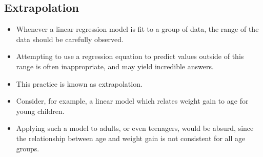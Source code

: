 \documentclass[]{report}
\begin{document}
	
	\subsection{Extrapolation}
	\begin{itemize}
		\item
		Whenever a linear regression model is fit to a group of data, the range of the data should be carefully observed. \item  Attempting to use a regression equation to predict values outside of this range is often inappropriate, and may yield incredible answers. \item This practice is known as extrapolation. \item Consider, for example, a linear model which relates weight gain to age for young children. \item Applying such a model to adults, or even teenagers, would be absurd, since the relationship between age and weight gain is not consistent for all age groups.
	\end{itemize}
	
	
\end{document}
